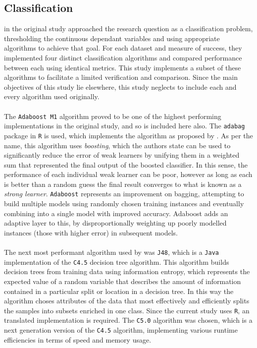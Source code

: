 {\subsection{Classification}
{\cite{moldovan2015learning} in the original study approached the research question as a classification problem, thresholding the continuous dependant variables and using appropriate algorithms to achieve that goal. For each dataset and measure of success, they implemented four distinct classification algorithms and compared performance between each using identical metrics. This study implements a subset of these algorithms to facilitate a limited verification and comparison. Since the main objectives of this study lie elsewhere, this study neglects to include each and every algorithm used originally.   \\\\
The \texttt{Adaboost M1} algorithm proved to be one of the highest performing implementations in the original study, and so is included here also. The \texttt{adabag} package in \texttt{R} is used, which implements the algorithm as proposed by \cite{freundAdaboost}. As per the name, this algorithm uses {\it boosting}, which the authors state can be used to significantly reduce the error of weak learners by unifying them in a weighted sum that represented the final output of the boosted classifier. In this sense, the performance of each individual weak learner can be poor, however as long as each is better than a random guess the final result converges to what is known as a {\it strong learner}. \texttt{Adaboost} represents an improvement on bagging, attempting to build multiple models using randomly chosen training instances and eventually combining into a single model with improved accuracy. Adaboost adds an adaptive layer to this, by disproportionally weighting up poorly modelled instances (those with higher error) in subsequent models.} \\\\
{The next most performant algorithm used by \cite{moldovan2015learning} was \texttt{J48}, which is a \texttt{Java} implementation of the \texttt{C4.5} decision tree algorithm. This algorithm builds decision trees from training data using information entropy, which represents the expected value of a random variable that describes the amount of information contained in a particular split or location in a decision tree. In this way the algorithm choses attributes of the data that most effectively and efficiently splits the samples into subsets enriched in one class. Since the current study uses \texttt{R}, an translated implementation is required. The \texttt{C5.0} algorithm was chosen, which is a next generation version of the \texttt{C4.5} algorithm, implementing various runtime efficiencies in terms of speed and memory usage.}
}
